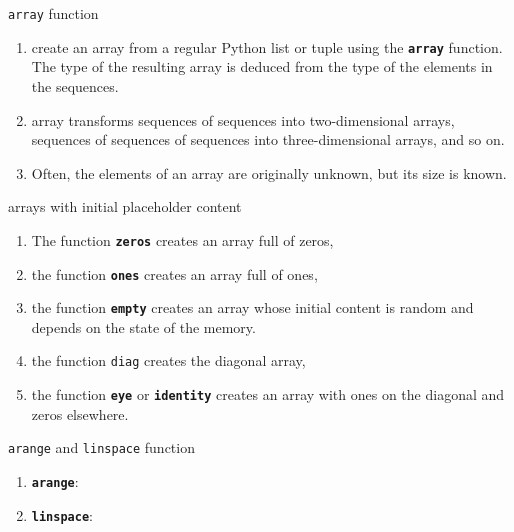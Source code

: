 \documentclass[ignorenonframetext,11pt,xcolor=dvipsnames,hyperref={colorlinks,allcolors=.,urlcolor=blue, citecolor=violet, bookmarksdepth=4},aspectratio=1610]{beamer}
\providecommand{\tightlist}{%
  \setlength{\itemsep}{0pt}\setlength{\parskip}{0pt}}
\newcommand{\passthrough}[1]{#1}
\begin{document}
\begin{frame}[fragile]{\passthrough{\lstinline!array!} function}
\protect\hypertarget{array-function}{}

\begin{enumerate}
\tightlist
\item
  create an array from a regular Python list or tuple using the
  \textbf{\passthrough{\lstinline!array!}} function. The type of the
  resulting array is deduced from the type of the elements in the
  sequences.
\item
  array transforms sequences of sequences into two-dimensional arrays,
  sequences of sequences of sequences into three-dimensional arrays, and
  so on.
\item
  Often, the elements of an array are originally unknown, but its size
  is known.
\end{enumerate}

\end{frame}

\begin{frame}[fragile]{arrays with initial placeholder content}
\protect\hypertarget{arrays-with-initial-placeholder-content}{}

\begin{enumerate}
\tightlist
\item
  The function \textbf{\passthrough{\lstinline!zeros!}} creates an array
  full of zeros,
\item
  the function \textbf{\passthrough{\lstinline!ones!}} creates an array
  full of ones,
\item
  the function \textbf{\passthrough{\lstinline!empty!}} creates an array
  whose initial content is random and depends on the state of the
  memory.
\item
  the function \passthrough{\lstinline!diag!} creates the diagonal
  array,
\item
  the function \textbf{\passthrough{\lstinline!eye!}} or
  \textbf{\passthrough{\lstinline!identity!}} creates an array with ones
  on the diagonal and zeros elsewhere.
\end{enumerate}

\end{frame}

\begin{frame}[fragile]{\passthrough{\lstinline!arange!} and
\passthrough{\lstinline!linspace!} function}
\protect\hypertarget{arange-and-linspace-function}{}

\begin{enumerate}
\tightlist
\item
  \textbf{\passthrough{\lstinline!arange!}}:
\item
  \textbf{\passthrough{\lstinline!linspace!}}:
\end{enumerate}

\end{frame}
\end{document}
